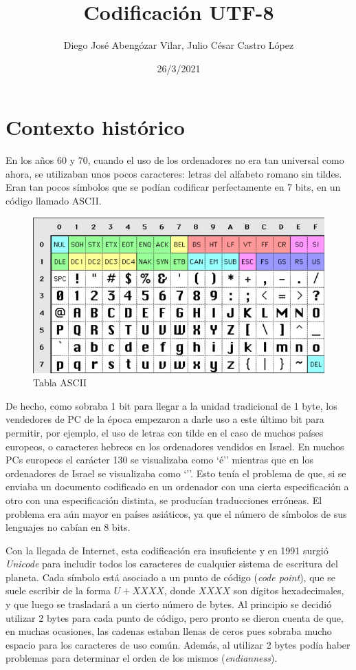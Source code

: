 \documentclass{article}
\title{\vspace{-1.7cm}\textbf{Codificación UTF-8}}
\author{Diego José Abengózar Vilar, Julio César Castro López}
\date{26/3/2021}
\begin{document}
\maketitle
\tableofcontents

\section{Contexto histórico}

En los años 60 y 70, cuando el uso de los ordenadores no era tan universal como
ahora, se utilizaban unos pocos caracteres: letras del alfabeto romano sin
tildes. Eran tan pocos símbolos que se podían codificar perfectamente en 7 bits,
en un código llamado ASCII.

\begin{figure}[h]
  \centering
  \includegraphics[width=1.0\textwidth]{ascii.jpeg}
  \caption{Tabla ASCII}
\end{figure}

De hecho, como sobraba 1 bit para llegar a la unidad tradicional de 1 byte, los
vendedores de PC de la época empezaron a darle uso a este último bit para
permitir, por ejemplo, el uso de letras con tilde en el caso de muchos países
europeos, o caracteres hebreos en los ordenadores vendidos en Israel. En muchos
PCs europeos el carácter 130 se visualizaba como `é'' mientras que en los
ordenadores de Israel se visualizaba como `''. Esto tenía el problema de
que, si se enviaba un documento codificado en un ordenador con una cierta
especificación a otro con una especificación distinta, se producían traducciones
erróneas. El problema era aún mayor en países asiáticos, ya que el número de
símbolos de sus lenguajes no cabían en 8 bits.

Con la llegada de Internet, esta codificación era insuficiente y en 1991 surgió
\textit{Unicode} para includir todos los caracteres de cualquier sistema de
escritura del planeta. Cada símbolo está asociado a un punto de código
(\textit{code point}), que se suele escribir de la forma $U+XXXX$, donde $XXXX$
son dígitos hexadecimales, y que luego se trasladará a un cierto número de
bytes. Al principio se decidió utilizar 2 bytes para cada punto de código, pero
pronto se dieron cuenta de que, en muchas ocasiones, las cadenas estaban llenas
de ceros pues sobraba mucho espacio para los caracteres de uso común. Además, al
utilizar 2 bytes podía haber problemas para determinar el orden de los mismos
(\textit{endianness}).
\end{document}
